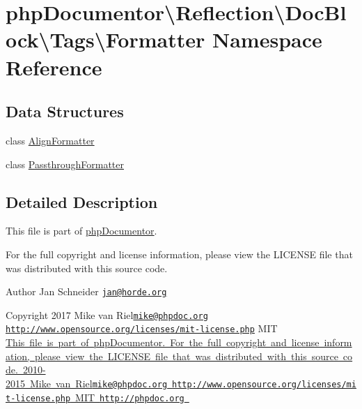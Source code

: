 \hypertarget{namespacephp_documentor_1_1_reflection_1_1_doc_block_1_1_tags_1_1_formatter}{}\section{php\+Documentor\textbackslash{}Reflection\textbackslash{}Doc\+Block\textbackslash{}Tags\textbackslash{}Formatter Namespace Reference}
\label{namespacephp_documentor_1_1_reflection_1_1_doc_block_1_1_tags_1_1_formatter}
\subsection*{Data Structures}
\begin{DoxyCompactItemize}
\item 
class \mbox{\hyperlink{classphp_documentor_1_1_reflection_1_1_doc_block_1_1_tags_1_1_formatter_1_1_align_formatter}{Align\+Formatter}}
\item 
class \mbox{\hyperlink{classphp_documentor_1_1_reflection_1_1_doc_block_1_1_tags_1_1_formatter_1_1_passthrough_formatter}{Passthrough\+Formatter}}
\end{DoxyCompactItemize}


\subsection{Detailed Description}
This file is part of \mbox{\hyperlink{namespacephp_documentor}{php\+Documentor}}.

For the full copyright and license information, please view the L\+I\+C\+E\+N\+SE file that was distributed with this source code.

\begin{DoxyAuthor}{Author}
Jan Schneider \href{mailto:jan@horde.org}{\tt jan@horde.\+org} 
\end{DoxyAuthor}
\begin{DoxyCopyright}{Copyright}
2017 Mike van Riel\href{mailto:mike@phpdoc.org}{\tt mike@phpdoc.\+org}  \href{http://www.opensource.org/licenses/mit-license.php}{\tt http\+://www.\+opensource.\+org/licenses/mit-\/license.\+php} M\+IT \mbox{\hyperlink{}{This file is part of php\+Documentor. For the full copyright and license information, please view the L\+I\+C\+E\+N\+SE file that was distributed with this source code.  2010-\/2015 Mike van Riel\href{mailto:mike@phpdoc.org}{\tt mike@phpdoc.\+org}  \href{http://www.opensource.org/licenses/mit-license.php}{\tt http\+://www.\+opensource.\+org/licenses/mit-\/license.\+php} M\+IT  \href{http://phpdoc.org}{\tt http\+://phpdoc.\+org} }}
\end{DoxyCopyright}
